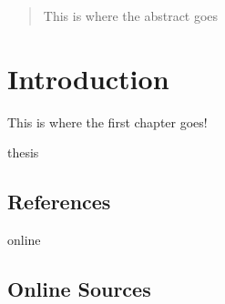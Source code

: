 \documentclass[12pt,a4paper]{report}
\begin{document}


\begin{abstract}
This is where the abstract goes
\end{abstract}

\tableofcontents

\chapter{Introduction} \label{chap:intro}

This is where the first chapter goes!

\newpage


\begin{btSect}{thesis} %
\section*{References}
\btPrintCited
\end{btSect}
\begin{btSect}{online}
\section*{Online Sources}
\btPrintCited
\end{btSect}
\end{document}
